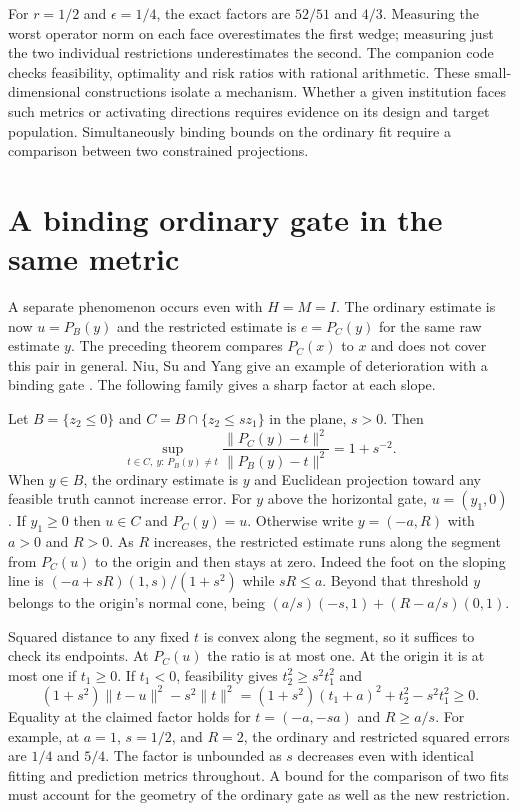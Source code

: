 \documentclass[11pt]{article}
\begin{document}
For $r=1/2$ and $\epsilon=1/4$, the exact factors are $52/51$ and $4/3$. Measuring the worst operator norm on each face overestimates the first wedge; measuring just the two individual restrictions underestimates the second. The companion code checks feasibility, optimality and risk ratios with rational arithmetic. These small-dimensional constructions isolate a mechanism. Whether a given institution faces such metrics or activating directions requires evidence on its design and target population. Simultaneously binding bounds on the ordinary fit require a comparison between two constrained projections.

\newpage
\section{A binding ordinary gate in the same metric}
A separate phenomenon occurs even with $H=M=I$. The ordinary estimate is now $u=P_B(y)$ and the restricted estimate is $e=P_C(y)$ for the same raw estimate $y$. The preceding theorem compares $P_C(x)$ to $x$ and does not cover this pair in general. Niu, Su and Yang give an example of deterioration with a binding gate \cite{niu}. The following family gives a sharp factor at each slope.

Let $B=\{z_2\le0\}$ and $C=B\cap\{z_2\le s z_1\}$ in the plane, $s>0$. Then
\[
  \sup_{t\in C,\ y:\,P_B(y)\ne t}
    \frac{\|P_C(y)-t\|^2}{\|P_B(y)-t\|^2}=1+s^{-2}.
\]
When $y\in B$, the ordinary estimate is $y$ and Euclidean projection toward any feasible truth cannot increase error. For $y$ above the horizontal gate, $u=(y_1,0)$. If $y_1\ge0$ then $u\in C$ and $P_C(y)=u$. Otherwise write $y=(-a,R)$ with $a>0$ and $R>0$. As $R$ increases, the restricted estimate runs along the segment from $P_C(u)$ to the origin and then stays at zero. Indeed the foot on the sloping line is $(-a+sR)(1,s)/(1+s^2)$ while $sR\le a$. Beyond that threshold $y$ belongs to the origin's normal cone, being $(a/s)(-s,1)+(R-a/s)(0,1)$.

Squared distance to any fixed $t$ is convex along the segment, so it suffices to check its endpoints. At $P_C(u)$ the ratio is at most one. At the origin it is at most one if $t_1\ge0$. If $t_1<0$, feasibility gives $t_2^2\ge s^2t_1^2$ and
\[
 (1+s^2)\|t-u\|^2-s^2\|t\|^2
   =(1+s^2)(t_1+a)^2+t_2^2-s^2t_1^2\ge0 .
\]
Equality at the claimed factor holds for $t=(-a,-sa)$ and $R\ge a/s$. For example, at $a=1$, $s=1/2$, and $R=2$, the ordinary and restricted squared errors are $1/4$ and $5/4$. The factor is unbounded as $s$ decreases even with identical fitting and prediction metrics throughout. A bound for the comparison of two fits must account for the geometry of the ordinary gate as well as the new restriction.
\end{document}
